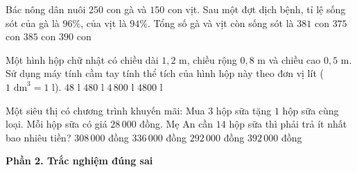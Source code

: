 \begin{ex} %
Bác nông dân nuôi $250$ con gà và $150$ con vịt. Sau một đợt dịch bệnh, tỉ lệ sống sót của gà là $96\%$, của vịt là $94\%$. Tổng số gà và vịt còn sống sót là
\choice
{\True $381$ con}
{$375$ con}
{$385$ con}
{$390$ con}
\end{ex}

\begin{ex} %
Một hình hộp chữ nhật có chiều dài $1{,}2\text{ m}$, chiều rộng $0{,}8\text{ m}$ và chiều cao $0{,}5\text{ m}$. Sử dụng máy tính cầm tay tính thể tích của hình hộp này theo đơn vị lít ($1\text{ dm}^3 = 1\text{ l}$).
\choice
{$48\text{ l}$}
{\True $480\text{ l}$}
{$4\,800\text{ l}$}
{$4800\text{ l}$}
\end{ex}

\begin{ex} %
Một siêu thị có chương trình khuyến mãi: Mua $3$ hộp sữa tặng $1$ hộp sữa cùng loại. Mỗi hộp sữa có giá $28\,000$ đồng. Mẹ An cần $14$ hộp sữa thì phải trả ít nhất bao nhiêu tiền?
\choice
{\True $308\,000$ đồng}
{$336\,000$ đồng}
{$292\,000$ đồng}
{$392\,000$ đồng}
\end{ex}

\textbf{Phần 2. Trắc nghiệm đúng sai}


